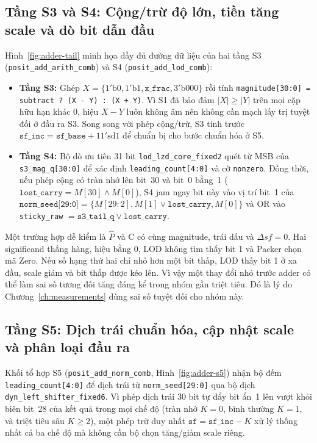 

\subsection{Tầng S3 và S4: Cộng/trừ độ lớn, tiền tăng scale và dò bit dẫn đầu}

Hình~\ref{fig:adder-tail} minh họa đầy đủ đường dữ liệu của hai tầng S3
(\texttt{posit\_add\_arith\_comb}) và S4 (\texttt{posit\_add\_lod\_comb}):
\begin{itemize}
  \item \textbf{Tầng S3:} Ghép $X = \{1'\mathrm{b0}, 1'\mathrm{b1}, \texttt{x\_frac}, 3'\mathrm{b000}\}$
  rồi tính \texttt{magnitude[30:0] = subtract ? (X - Y) : (X + Y)}. Vì S1 đã bảo đảm
  $|X|\ge|Y|$ trên mọi cặp hữu hạn khác 0, hiệu $X-Y$ luôn không âm nên không cần
  mạch lấy trị tuyệt đối ở đầu ra S3. Song song với phép cộng/trừ, S3 tính trước
  $\texttt{sf\_inc} = \texttt{sf\_base} + 11'\mathrm{sd1}$ để chuẩn bị cho bước chuẩn hóa ở S5.
  \item \textbf{Tầng S4:} Bộ dò ưu tiên 31 bit \texttt{lod\_lzd\_core\_fixed2} quét từ
  MSB của \texttt{s3\_mag\_q[30:0]} để xác định \texttt{leading\_count[4:0]} và cờ
  \texttt{nonzero}. Đồng thời, nếu phép cộng có tràn nhớ lên bit~30 và bit~0 bằng~1
  ($\texttt{lost\_carry} = M[30]\land M[0]$), S4 jam ngay bit này vào vị trí bit~1 của
  $\texttt{norm\_seed[29:0]} = \{M[29:2], M[1]\lor\texttt{lost\_carry}, M[0]\}$ và OR
  vào \texttt{sticky\_raw} $= \texttt{s3\_tail\_q} \lor \texttt{lost\_carry}$.
\end{itemize}



Một trường hợp dễ kiểm là $\widehat P$ và C có cùng magnitude,
trái dấu và $\Delta sf=0$. Hai significand thẳng hàng,
hiệu bằng 0, LOD không tìm thấy bit 1 và Packer chọn mã Zero.
Nếu số hạng thứ hai chỉ nhỏ hơn một bit thấp, LOD thấy bit 1
ở xa đầu, scale giảm và bit thấp được kéo lên. Vì vậy một
thay đổi nhỏ trước adder có thể làm sai số tương đối tăng
đáng kể trong nhóm gần triệt tiêu. Đó là lý do Chương~\ref{ch:measurements}
dùng sai số tuyệt đối cho nhóm này.

\subsection{Tầng S5: Dịch trái chuẩn hóa, cập nhật scale và phân loại đầu ra}

Khối tổ hợp S5 (\texttt{posit\_add\_norm\_comb}, Hình~\ref{fig:adder-s5}) nhận
bộ đếm \texttt{leading\_count[4:0]} để dịch trái từ \texttt{norm\_seed[29:0]} qua
bộ dịch \texttt{dyn\_left\_shifter\_fixed6}. Vì phép dịch trái 30 bit tự đẩy bit ẩn~1 lên
vượt khỏi biên bit~28 của kết quả trong mọi chế độ (tràn nhớ $K=0$, bình thường
$K=1$, và triệt tiêu sâu $K\ge 2$), một phép trừ duy nhất
$\texttt{sf} = \texttt{sf\_inc} - K$ xử lý thống nhất cả ba chế độ mà không cần bộ
chọn tăng/giảm scale riêng.

